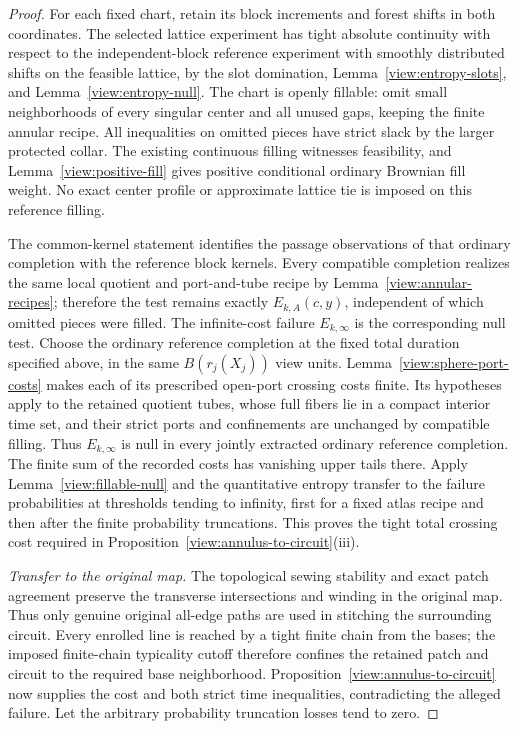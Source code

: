 \begin{proof}
For each fixed chart, retain its block increments and forest shifts in
both coordinates.  The selected lattice experiment has tight absolute
continuity with respect to the independent-block reference experiment
with smoothly distributed shifts on the feasible lattice, by the slot
domination, Lemma~\ref{view:entropy-slots}, and
Lemma~\ref{view:entropy-null}.  The chart is openly fillable: omit small
neighborhoods of every singular center and all unused gaps, keeping the
finite annular recipe.  All inequalities on omitted pieces have strict
slack by the larger protected collar.  The existing continuous filling
witnesses feasibility, and Lemma~\ref{view:positive-fill} gives positive
conditional ordinary Brownian fill weight.  No exact center profile or
approximate lattice tie is imposed on this reference filling.

The common-kernel statement identifies the passage observations of that
ordinary completion with the reference block kernels.  Every compatible
completion realizes the same local quotient and port-and-tube recipe by
Lemma~\ref{view:annular-recipes}; therefore the test remains exactly
$E_{k,A}(c,y)$, independent of which omitted pieces were filled.
The infinite-cost failure $E_{k,\infty}$ is the corresponding null
test.  Choose the ordinary reference completion at the fixed total
duration specified above, in the same $B(r_j(X_j))$ view units.
Lemma~\ref{view:sphere-port-costs} makes each of its prescribed
open-port crossing costs finite.  Its hypotheses apply to the
retained quotient tubes, whose full fibers lie in a compact interior
time set, and their strict ports and confinements are unchanged by
compatible filling.  Thus $E_{k,\infty}$ is null in every jointly
extracted ordinary reference completion.  The finite sum of the
recorded costs has vanishing upper tails there.
Apply Lemma~\ref{view:fillable-null} and the quantitative entropy
transfer to the failure probabilities at thresholds tending to infinity,
first for a fixed atlas recipe
and then after the finite probability truncations.  This proves the
tight total crossing cost required in
Proposition~\ref{view:annulus-to-circuit}(iii).

\smallskip\noindent\emph{Transfer to the original map.}
The topological sewing stability and exact patch agreement preserve the
transverse intersections and winding in the original map.  Thus only
genuine original all-edge paths are used in stitching the surrounding
circuit.  Every enrolled line is reached by a tight finite chain from
the bases; the imposed finite-chain typicality cutoff therefore confines
the retained patch and circuit to the required base neighborhood.
Proposition~\ref{view:annulus-to-circuit} now supplies the cost and both
strict time inequalities, contradicting the alleged failure.  Let the
arbitrary probability truncation losses tend to zero.
\end{proof}

